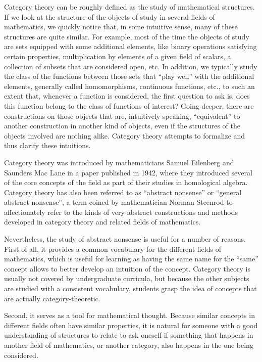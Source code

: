 Category theory can be roughly defined as the study of mathematical
structures. If we look at the structure of the objects of study in several
fields of mathematics, we quickly notice that, in some intuitive sense, many of
these structures are quite similar. For example, most of the time the objects of
study are sets equipped with some additional elements, like binary operations
satisfying certain properties, multiplication by elements of a given field of
scalars, a collection of subsets that are considered open, etc. In addition, we
typically study the class of the functions between those sets that ``play well''
with the additional elements, generally called homomorphisms, continuous
functions, etc., to such an extent that, whenever a function is considered, the
first question to ask is, does this function belong to the class of functions of
interest? Going deeper, there are constructions on those objects that are,
intuitively speaking, ``equivalent'' to another construction in another kind of
objects, even if the structures of the objects involved are nothing
alike. Category theory attempts to formalize and thus clarify these intuitions.

Category theory was introduced by mathematicians Samuel Eilenberg and Saunders
Mac Lane in a paper published in 1942, where they introduced several of the core
concepts of the field as part of their studies in homological
algebra.\cite[p. 29]{maclane} Category theory has also been referred to as
``abstract nonsense'' or ``general abstract nonsense'', a term coined by
mathematician Norman Steenrod to affectionately refer to the kinds of very
abstract constructions and methods developed in category theory and related
fields of mathematics.\cite[preface, p. x]{riehl}

Nevertheless, the study of abstract nonsense is useful for a number of
reasons. First of all, it provides a common vocabulary for the different fields
of mathematics, which is useful for learning as having the same name for the
``same'' concept allows to better develop an intuition of the concept. Category
theory is usually not covered by undergraduate curricula, but because the other
subjects are studied with a consistent vocabulary, students grasp the idea of
concepts that are actually category-theoretic.

Second, it serves as a tool for mathematical thought. Because similar concepts
in different fields often have similar properties, it is natural for someone
with a good understanding of structures to relate to ask oneself if something
that happens in another field of mathematics, or another category, also happens
in the one being considered.

